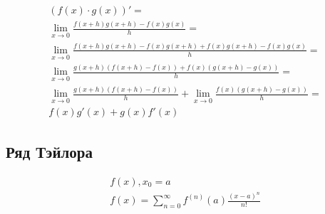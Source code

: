 \documentclass{article}
\begin{document}
\begin{gather*}
	(f(x) \cdot g(x))' = \\
	\lim_{x \to 0} \frac{f(x + h)g(x + h) - f(x)g(x)}{h} = \\
	\lim_{x \to 0} \frac{f(x + h)g(x + h) - f(x)g(x + h) + f(x)g(x + h) - f(x)g(x)}{h} = \\
	\lim_{x \to 0} \frac{g(x + h)(f(x + h) - f(x)) + f(x)(g(x + h) - g(x))}{h} = \\
	\lim_{x \to 0} \frac{g(x + h)(f(x + h) - f(x))}{h} + \lim_{x \to 0} \frac{f(x)(g(x + h) - g(x))}{h} = \\
	f(x)g'(x) + g(x)f'(x)
\end{gather*}

\subsection{Ряд Тэйлора}

\begin{gather*}
	f(x), x_0 = a \\
	f(x) = \sum_{n=0}^{\infty} f^{(n)}(a) \frac{(x - a)^n}{n!}
\end{gather*}
\end{document}
